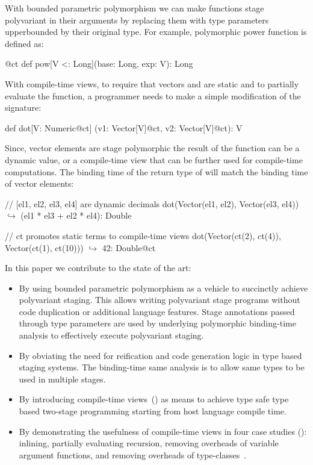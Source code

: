 With bounded parametric polymorphism we can make functions stage polyvariant in their arguments by replacing them with
type parameters upperbounded by their original type. For example, polymorphic power function is defined as:\begin{lstparagraph}
@ct def pow[V <: Long](base: Long, exp: V): Long
\end{lstparagraph}

With compile-time views, to require that vectors  and  are
 static and to partially evaluate the function, a programmer needs to make
 a simple modification of the  signature:\begin{lstparagraph}
def dot[V: Numeric@ct]
  (v1: Vector[V]@ct, v2: Vector[V]@ct): V
\end{lstparagraph}

Since, vector elements are stage polymorphic the result
 of the function can be a dynamic value, or a compile-time view
 that can be further used for compile-time computations. The binding time of
 the return type of  will match the binding time of vector elements:

\vspace{1.8mm}
\begin{listing}[mathescape]
  // [el1, el2, el3, el4] are dynamic decimals
  dot(Vector(el1, el2), Vector(el3, el4))
    $\hookrightarrow$ (el1 * el3 + el2 * el4): Double

  // ct promotes static terms to compile-time views
  dot(Vector(ct(2), ct(4)), Vector(ct(1), ct(10)))
    $\hookrightarrow$ 42: Double@ct
\end{listing}
\vspace{1.8mm}

In this paper we contribute to the state of the art:
\begin{itemize}
 \item By using bounded parametric polymorphism as a vehicle to succinctly
   achieve polyvariant staging. This allows writing polyvariant stage programs
   without code duplication or additional language features. Stage annotations
   passed through type parameters are used by underlying polymorphic binding-time
   analysis to effectively execute polyvariant staging.

 \item By obviating the need for reification and code generation logic in type based staging systems. The binding-time
   same analysis is to allow same types to be used in multiple stages.

 \item By introducing compile-time views~() as means to achieve
  type safe type based two-stage programming starting from host language compile time.

 \item By demonstrating the usefulness of compile-time views in four case
  studies (): inlining, partially evaluating recursion,
  removing overheads of variable argument functions, and removing overheads of
  type-classes~\cite{wadler1989make,hall_type_1996,oliveira_type_2010}.

\end{itemize}

